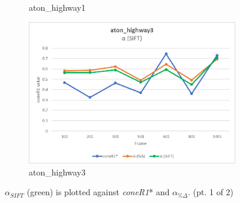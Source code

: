 \begin{appendices}
\begin{figure}
\begin{subfigure}{.45\linewidth}
  \caption{aton\_highway1}
\end{subfigure}
\hfill
\begin{subfigure}{.45\linewidth}
  \includegraphics[width=1\linewidth]{figures/appendix/highway3_sift.jpg}
  \caption{aton\_highway3}
\end{subfigure}
\caption{$\alpha_{SIFT}$ (green) is plotted against \textit{coneR1}* and $\alpha_{\%\Delta}$. (pt. 1 of 2)}

\end{figure}

\begin{figure}


\end{figure}
\end{appendices}
